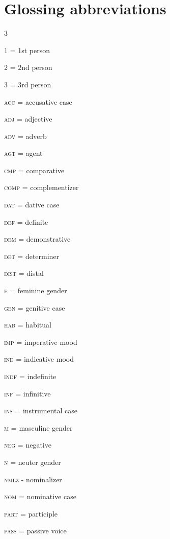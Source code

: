\documentclass{article}[12pt]
\begin{document}
\section{Glossing abbreviations}

\vspace{0.25cm}

\begin{multicols}{3}

\textsc{1} = 1st person

\textsc{2} = 2nd person

\textsc{3} = 3rd person


\textsc{acc} = accusative case


\textsc{adj} = adjective

\textsc{adv} = adverb

\textsc{agt} = agent

\textsc{cmp} = comparative

\textsc{comp} = complementizer

\textsc{dat} = dative case

\textsc{def} = definite

\textsc{dem} = demonstrative

\textsc{det} = determiner

\textsc{dist} = distal

\textsc{f} = feminine gender

\textsc{gen} = genitive case

\textsc{hab} = habitual

\textsc{imp} = imperative mood

\textsc{ind} = indicative mood

\textsc{indf} = indefinite

\textsc{inf} = infinitive

\textsc{ins} = instrumental case

\textsc{m} = masculine gender

\textsc{neg} = negative

\textsc{n} = neuter gender

\textsc{nmlz} - nominalizer

\textsc{nom} = nominative case

\textsc{part} = participle

\textsc{pass} = passive voice



\end{multicols}
\end{document}
